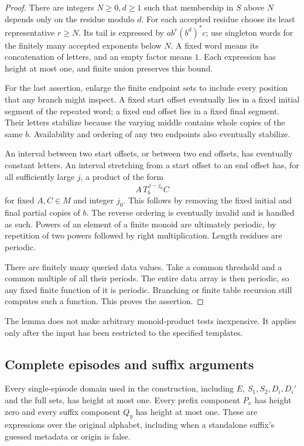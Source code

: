 \begin{proof}
There are integers \(N\ge0,d\ge1\) such that membership in \(S\) above \(N\)
depends only on the residue modulo \(d\).
For each accepted residue choose its least representative \(r\ge N\).
Its tail is expressed by \(ab^r(b^d)^*c\); use singleton words for the finitely
many accepted exponents below \(N\). A fixed word means its concatenation of
letters, and an empty factor means \(1\). Each expression has height at most
one, and finite union preserves this bound.

For the last assertion, enlarge the finite endpoint sets to include every
position that any branch might inspect. A fixed start offset eventually lies
in a fixed initial segment of the repeated word; a fixed end offset lies in
a fixed final segment. Their letters stabilize because the varying middle
contains whole copies of the same \(b\). Availability and ordering of any
two endpoints also eventually stabilize.

An interval between two start offsets, or between two end offsets, has
eventually constant letters. An interval stretching from a start offset to an
end offset has, for all sufficiently large \(j\), a product of the form
\[
                         A\,T_b^{\,j-j_0}C
\]
for fixed \(A,C\in M\) and integer \(j_0\).
This follows by removing the fixed initial and final partial copies of \(b\).
The reverse ordering is eventually invalid and is handled as such.
Powers of an element of a finite monoid are ultimately periodic, by repetition
of two powers followed by right multiplication. Length residues are periodic.

There are finitely many queried data values. Take a common threshold and a
common multiple of all their periods. The entire data array is then periodic,
so any fixed finite function of it is periodic. Branching or finite table
recursion still computes such a function. This proves the assertion.
\end{proof}

The lemma does not make arbitrary monoid-product tests inexpensive. It applies
only after the input has been restricted to the specified templates.

\subsection{Complete episodes and suffix arguments}

\begin{proposition}\label{prop:component-cost}
Every single-episode domain used in the construction, including \(E\),
\(S_1,S_2,D_i,D_i'\) and the full sets, has height at most one.
Every prefix component \(P_x\) has height zero and every suffix component
\(Q_y\) has height at most one. These are expressions over the original
alphabet, including when a standalone suffix's guessed metadata or origin
is false.
\end{proposition}


